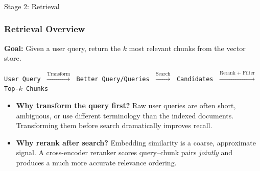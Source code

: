 \begin{frame}[fragile]\frametitle{}
\begin{center}
{\Large Stage 2: Retrieval}
\end{center}
\end{frame}

\begin{frame}[fragile]\frametitle{Retrieval Overview}

\textbf{Goal:} Given a user query, return the $k$ most relevant chunks from the vector store.

\vspace{0.3em}
\begin{center}
\small
\texttt{User Query}
$\;\xrightarrow{\text{Transform}}\;$
\texttt{Better Query/Queries}
$\;\xrightarrow{\text{Search}}\;$
\texttt{Candidates}
$\;\xrightarrow{\text{Rerank + Filter}}\;$
\texttt{Top-}$k$\texttt{ Chunks}
\end{center}

\vspace{0.4em}
\begin{itemize}
  \item \textbf{Why transform the query first?} Raw user queries are often short, ambiguous, or use different terminology than the indexed documents. Transforming them before search dramatically improves recall.
  \item \textbf{Why rerank after search?} Embedding similarity is a coarse, approximate signal. A cross-encoder reranker scores query--chunk pairs \textit{jointly} and produces a much more accurate relevance ordering.
\end{itemize}



\end{frame}

